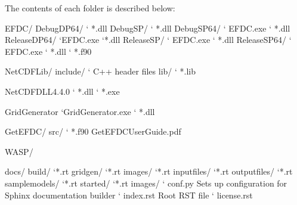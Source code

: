 \documentclass[letterpaper,10pt,english]{sphinxmanual}
\begin{document}
The contents of each folder is described below:

\begin{sphinxVerbatim}[commandchars=\\\{\}]
EFDC/ \PYGZhy{}
        \textbar{}\PYGZhy{}\PYGZhy{} DebugDP64/
                {}`\PYGZhy{}\PYGZhy{} *.dll
        \textbar{}\PYGZhy{}\PYGZhy{} DebugSP/
                {}`\PYGZhy{}\PYGZhy{} *.dll
        \textbar{}\PYGZhy{}\PYGZhy{} DebugSP64/
                {}`\PYGZhy{}\PYGZhy{} EFDC.exe
                {}`\PYGZhy{}\PYGZhy{} *.dll
        \textbar{}\PYGZhy{}\PYGZhy{} ReleaseDP64/
                {}`\PYGZhy{}\PYGZhy{}EFDC.exe
                {}`\PYGZhy{}\PYGZhy{}*.dll
        \textbar{}\PYGZhy{}\PYGZhy{} ReleaseSP/
                {}`\PYGZhy{}\PYGZhy{} EFDC.exe
                {}`\PYGZhy{}\PYGZhy{} *.dll
        \textbar{}\PYGZhy{}\PYGZhy{} ReleaseSP64/
                {}`\PYGZhy{}\PYGZhy{} EFDC.exe
                {}`\PYGZhy{}\PYGZhy{} *.dll
        {}`\PYGZhy{}\PYGZhy{} *.f90

NetCDFLib/
        \textbar{}\PYGZhy{}\PYGZhy{}     include/
                {}`\PYGZhy{}\PYGZhy{} C++ header files
        \textbar{}\PYGZhy{}\PYGZhy{}     lib/
                {}`\PYGZhy{}\PYGZhy{} *.lib

NetCDFDLL4.4.0
        {}`\PYGZhy{}\PYGZhy{}     *.dll
        {}`\PYGZhy{}\PYGZhy{}     *.exe

GridGenerator
        {}`\PYGZhy{}\PYGZhy{}GridGenerator.exe
        {}`\PYGZhy{}\PYGZhy{}     *.dll

GetEFDC/
        \textbar{}\PYGZhy{}\PYGZhy{} src/
                {}`\PYGZhy{}\PYGZhy{} *.f90
        \textbar{}\PYGZhy{}\PYGZhy{} GetEFDC\PYGZus{}User\PYGZus{}Guide.pdf

WASP/

docs/
        \textbar{}\PYGZhy{}\PYGZhy{} build/
                {}`\PYGZhy{}\PYGZhy{}*.rt
        \textbar{}\PYGZhy{}\PYGZhy{} gridgen/
                {}`\PYGZhy{}\PYGZhy{}*.rt
        \textbar{}\PYGZhy{}\PYGZhy{} images/
                {}`\PYGZhy{}\PYGZhy{}*.rt
        \textbar{}\PYGZhy{}\PYGZhy{} inputfiles/
                {}`\PYGZhy{}\PYGZhy{}*.rt
        \textbar{}\PYGZhy{}\PYGZhy{} outputfiles/
                {}`\PYGZhy{}\PYGZhy{}*.rt
        \textbar{}\PYGZhy{}\PYGZhy{} samplemodels/
                {}`\PYGZhy{}\PYGZhy{}*.rt
        \textbar{}\PYGZhy{}\PYGZhy{} started/
                {}`\PYGZhy{}\PYGZhy{}*.rt
        \textbar{}\PYGZhy{}\PYGZhy{} \PYGZus{}images/
        {}`\PYGZhy{}\PYGZhy{} conf.py \PYGZhy{} Sets up configuration for Sphinx documentation builder
        {}`\PYGZhy{}\PYGZhy{} index.rst \PYGZhy{} Root RST file
        {}`\PYGZhy{}\PYGZhy{} license.rst
\end{sphinxVerbatim}
\end{document}
